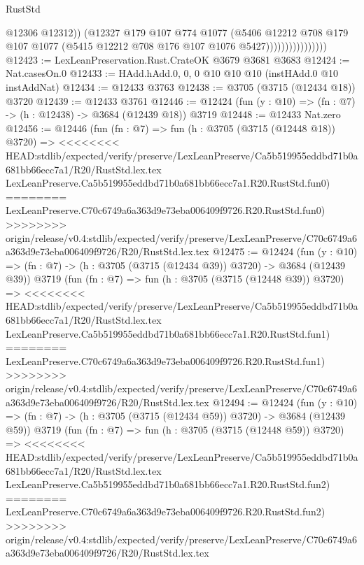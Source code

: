 \begin{lexlean}{RustStd}
\begin{coremodule}
{\begin{coremodule}
{{{{{{{{{{{{{{                                  @12306
                                  @12312))
                              (@12327
                                @179
                                @107
                                @774
                                @1077
                                (@5406
                                  @12212
                                  @708
                                  @179
                                  @107
                                  @1077
                                  (@5415 @12212 @708 @176 @107 @1076 @5427))))))))))))))))
@12423 := LexLeanPreservation.Rust.CrateOK @3679 @3681 @3683
@12424 := Nat.casesOn.{0}
@12433 := HAdd.hAdd.{0, 0, 0} @10 @10 @10 (instHAdd.{0} @10 instAddNat)
@12434 := @12433 @3763
@12438 := @3705 (@3715 (@12434 @18)) @3720
@12439 := @12433 @3761
@12446 := @12424 (fun (y : @10) => (fn : @7) -> (h : @12438) -> @3684 (@12439 @18)) @3719
@12448 := @12433 Nat.zero
@12456 := @12446
    (fun (fn : @7) =>
    fun (h : @3705 (@3715 (@12448 @18)) @3720) =>
<<<<<<<< HEAD:stdlib/expected/verify/preserve/LexLeanPreserve/Ca5b519955eddbd71b0a681bb66ecc7a1/R20/RustStd.lex.tex
    LexLeanPreserve.Ca5b519955eddbd71b0a681bb66ecc7a1.R20.RustStd.fun0)
========
    LexLeanPreserve.C70c6749a6a363d9e73eba006409f9726.R20.RustStd.fun0)
>>>>>>>> origin/release/v0.4:stdlib/expected/verify/preserve/LexLeanPreserve/C70c6749a6a363d9e73eba006409f9726/R20/RustStd.lex.tex
@12475 := @12424
    (fun (y : @10) => (fn : @7) -> (h : @3705 (@3715 (@12434 @39)) @3720) -> @3684 (@12439 @39))
    @3719
    (fun (fn : @7) =>
    fun (h : @3705 (@3715 (@12448 @39)) @3720) =>
<<<<<<<< HEAD:stdlib/expected/verify/preserve/LexLeanPreserve/Ca5b519955eddbd71b0a681bb66ecc7a1/R20/RustStd.lex.tex
    LexLeanPreserve.Ca5b519955eddbd71b0a681bb66ecc7a1.R20.RustStd.fun1)
========
    LexLeanPreserve.C70c6749a6a363d9e73eba006409f9726.R20.RustStd.fun1)
>>>>>>>> origin/release/v0.4:stdlib/expected/verify/preserve/LexLeanPreserve/C70c6749a6a363d9e73eba006409f9726/R20/RustStd.lex.tex
@12494 := @12424
    (fun (y : @10) => (fn : @7) -> (h : @3705 (@3715 (@12434 @59)) @3720) -> @3684 (@12439 @59))
    @3719
    (fun (fn : @7) =>
    fun (h : @3705 (@3715 (@12448 @59)) @3720) =>
<<<<<<<< HEAD:stdlib/expected/verify/preserve/LexLeanPreserve/Ca5b519955eddbd71b0a681bb66ecc7a1/R20/RustStd.lex.tex
    LexLeanPreserve.Ca5b519955eddbd71b0a681bb66ecc7a1.R20.RustStd.fun2)
========
    LexLeanPreserve.C70c6749a6a363d9e73eba006409f9726.R20.RustStd.fun2)
>>>>>>>> origin/release/v0.4:stdlib/expected/verify/preserve/LexLeanPreserve/C70c6749a6a363d9e73eba006409f9726/R20/RustStd.lex.tex
}}}}}}}}}}}}}}
\end{coremodule}}
\end{coremodule}
\end{lexlean}
